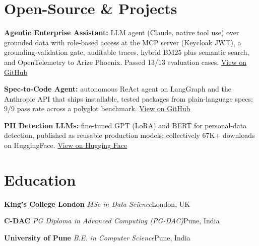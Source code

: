 \documentclass[10pt,a4paper]{article}
\newcommand{\sep}{\,\textcolor{accent!60}{\textbar}\,}
\begin{document}
\section{Open-Source \& Projects}
\begin{tight}
  \item \textbf{Agentic Enterprise Assistant:} LLM agent (Claude, native tool use) over grounded data with role-based access at the MCP server (Keycloak JWT), a grounding-validation gate, auditable traces, hybrid BM25 plus semantic search, and OpenTelemetry to Arize Phoenix. Passed 13/13 evaluation cases. \href{https://github.com/abhijeetscode/Agentic-Enterprise-Assistant}{View on GitHub}
  \item \textbf{Spec-to-Code Agent:} autonomous ReAct agent on LangGraph and the Anthropic API that ships installable, tested packages from plain-language specs; 9/9 pass rate across a polyglot benchmark. \href{https://github.com/abhijeetscode/Spec-to-Code-Agent}{View on GitHub}
  \item \textbf{PII Detection LLMs:} fine-tuned GPT (LoRA) and BERT for personal-data detection, published as reusable production models; collectively 67K+ downloads on HuggingFace. \href{https://huggingface.co/ab-ai/pii_model}{View on Hugging Face}
\end{tight}

\section{Education}
{\color{company}\bfseries King's College London}\sep{\itshape MSc in Data Science}\hfill {\color{muted}London, UK}\par\vspace{1pt}
{\color{company}\bfseries C-DAC}\sep{\itshape PG Diploma in Advanced Computing (PG-DAC)}\hfill {\color{muted}Pune, India}\par\vspace{1pt}
{\color{company}\bfseries University of Pune}\sep{\itshape B.E. in Computer Science}\hfill {\color{muted}Pune, India}\par
\end{document}
